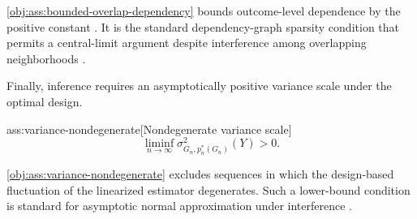 \cref{obj:ass:bounded-overlap-dependency} bounds outcome-level dependence by the positive constant . It is the standard dependency-graph sparsity condition that permits a central-limit argument despite interference among overlapping neighborhoods \citep{AronowSamii2017GeneralInterference}.

Finally, inference requires an asymptotically positive variance scale under the optimal design.

\begin{assumptionv}{ass:variance-nondegenerate}[Nondegenerate variance scale]
\[
\liminf_{n\to\infty}\sigma^2_{G_n,p_n^*(G_n)}(Y)>0.
\]
\end{assumptionv}

\cref{obj:ass:variance-nondegenerate} excludes sequences in which the design-based fluctuation of the linearized estimator degenerates. Such a lower-bound condition is standard for asymptotic normal approximation under interference \citep{LuShiFangZhangDing2025BipartiteDesign}.
